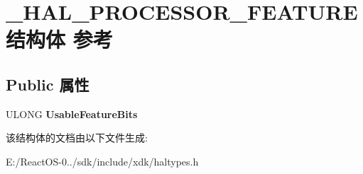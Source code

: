 \hypertarget{struct___h_a_l___p_r_o_c_e_s_s_o_r___f_e_a_t_u_r_e}{}\section{\+\_\+\+H\+A\+L\+\_\+\+P\+R\+O\+C\+E\+S\+S\+O\+R\+\_\+\+F\+E\+A\+T\+U\+R\+E结构体 参考}
\label{struct___h_a_l___p_r_o_c_e_s_s_o_r___f_e_a_t_u_r_e}
\subsection*{Public 属性}
\begin{DoxyCompactItemize}
\item 
\mbox{\label{struct___h_a_l___p_r_o_c_e_s_s_o_r___f_e_a_t_u_r_e_a4d217f8213248bdb248093f8f71a61ca}} 
U\+L\+O\+NG {\bfseries Usable\+Feature\+Bits}
\end{DoxyCompactItemize}


该结构体的文档由以下文件生成\+:\begin{DoxyCompactItemize}
\item 
E\+:/\+React\+O\+S-\/0../sdk/include/xdk/haltypes.\+h\end{DoxyCompactItemize}
